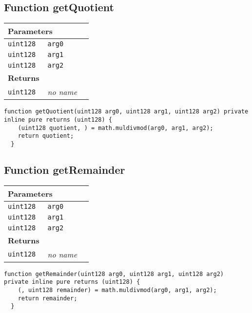 \subsection{Function getQuotient}


\ifsoltables
\noindent\begin{tabular}{|l|l|p{5cm}|}\hline
\multicolumn{3}{|l|}{\bf Parameters}\\\hline
\tt uint128 & \tt arg0 &\\\hline
\tt uint128 & \tt arg1 &\\\hline
\tt uint128 & \tt arg2 &\\\hline
\multicolumn{3}{|l|}{\bf Returns}\\\hline
\tt uint128 & {\em no name} &\\\hline
\end{tabular}
\fi

\vspace{2cm}

\begin{lstlisting}[firstnumber=109]
  function getQuotient(uint128 arg0, uint128 arg1, uint128 arg2) private inline pure returns (uint128) {
    (uint128 quotient, ) = math.muldivmod(arg0, arg1, arg2);
    return quotient;
  }
\end{lstlisting}

\subsection{Function getRemainder}


\ifsoltables
\noindent\begin{tabular}{|l|l|p{5cm}|}\hline
\multicolumn{3}{|l|}{\bf Parameters}\\\hline
\tt uint128 & \tt arg0 &\\\hline
\tt uint128 & \tt arg1 &\\\hline
\tt uint128 & \tt arg2 &\\\hline
\multicolumn{3}{|l|}{\bf Returns}\\\hline
\tt uint128 & {\em no name} &\\\hline
\end{tabular}
\fi

\vspace{2cm}

\begin{lstlisting}[firstnumber=115]
  function getRemainder(uint128 arg0, uint128 arg1, uint128 arg2) private inline pure returns (uint128) {
    (, uint128 remainder) = math.muldivmod(arg0, arg1, arg2);
    return remainder;
  }
\end{lstlisting}

